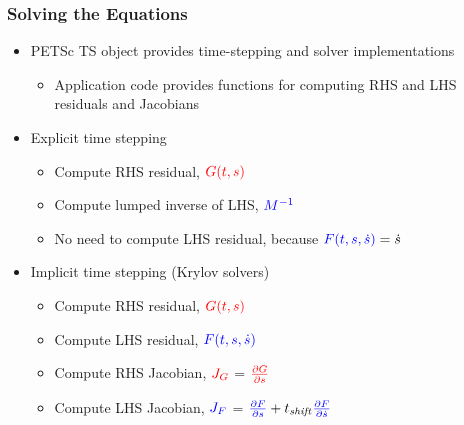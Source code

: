 \documentclass[aspectratio=169,hyperref=colorlinks]{beamer}
\newcommand{\lhs}[1]{{\color{blue}#1}}
\newcommand{\rhs}[1]{{\color{red}#1}}
\begin{document}
\begin{frame}
  \frametitle{Solving the Equations}

  \begin{itemize}
  \item PETSc TS object provides time-stepping and solver implementations
    \begin{itemize}
    \item Application code provides functions for computing RHS and LHS residuals and Jacobians
    \end{itemize}
  \item Explicit time stepping
    \begin{itemize}
    \item Compute RHS residual, $\rhs{G(t,s)}$
    \item Compute lumped inverse of LHS, $\lhs{M^{-1}}$
    \item No need to compute LHS residual, because $\lhs{F(t,s,\dot{s})} = \dot{s}$
    \end{itemize}
  \item Implicit time stepping (Krylov solvers)
    \begin{itemize}
    \item Compute RHS residual, $\rhs{G(t,s)}$
    \item Compute LHS residual, $\lhs{F(t,s,\dot{s})}$
    \item Compute RHS Jacobian, $\rhs{J_G}$ = $\rhs{\frac{\partial G}{\partial s}}$
    \item Compute LHS Jacobian, $\lhs{J_F}$ = $\lhs{\frac{\partial F}{\partial s}} + t_\mathit{shift}\lhs{\frac{\partial F}{\partial \dot{s}}}$
    \end{itemize}
  \end{itemize}

\end{frame}
\end{document}
